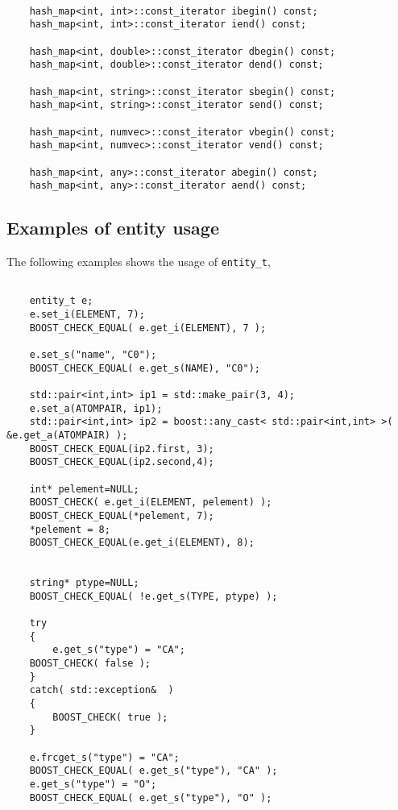 \documentclass[letterpaper]{book}
\begin{document}
\begin{lstlisting}

    hash_map<int, int>::const_iterator ibegin() const;
    hash_map<int, int>::const_iterator iend() const;

    hash_map<int, double>::const_iterator dbegin() const;
    hash_map<int, double>::const_iterator dend() const;

    hash_map<int, string>::const_iterator sbegin() const;
    hash_map<int, string>::const_iterator send() const;

    hash_map<int, numvec>::const_iterator vbegin() const;
    hash_map<int, numvec>::const_iterator vend() const;

    hash_map<int, any>::const_iterator abegin() const;
    hash_map<int, any>::const_iterator aend() const;

\end{lstlisting}


\subsection{Examples of entity usage}

The following examples shows the usage of \lstinline$entity_t$,

\begin{lstlisting}

    entity_t e;
    e.set_i(ELEMENT, 7);
    BOOST_CHECK_EQUAL( e.get_i(ELEMENT), 7 );

    e.set_s("name", "C0");
    BOOST_CHECK_EQUAL( e.get_s(NAME), "C0");

    std::pair<int,int> ip1 = std::make_pair(3, 4);
    e.set_a(ATOMPAIR, ip1);
    std::pair<int,int> ip2 = boost::any_cast< std::pair<int,int> >( &e.get_a(ATOMPAIR) );
    BOOST_CHECK_EQUAL(ip2.first, 3);
    BOOST_CHECK_EQUAL(ip2.second,4);

    int* pelement=NULL;
    BOOST_CHECK( e.get_i(ELEMENT, pelement) );
    BOOST_CHECK_EQUAL(*pelement, 7);
    *pelement = 8;
    BOOST_CHECK_EQUAL(e.get_i(ELEMENT), 8);


    string* ptype=NULL;
    BOOST_CHECK_EQUAL( !e.get_s(TYPE, ptype) );

    try
    {
        e.get_s("type") = "CA";
	BOOST_CHECK( false );
    }
    catch( std::exception&  )
    {
        BOOST_CHECK( true );
    }
    
    e.frcget_s("type") = "CA";
    BOOST_CHECK_EQUAL( e.get_s("type"), "CA" );
    e.get_s("type") = "O";
    BOOST_CHECK_EQUAL( e.get_s("type"), "O" );

\end{lstlisting}
\end{document}

